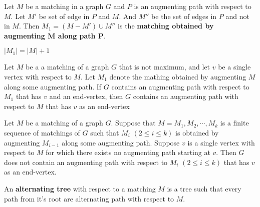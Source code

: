 \begin{definition}
	Let $M$ be a matching in a graph $G$ and $P$ is an augmenting path with respect to $M$.
	Let $M'$ be set of edge in $P$ and $M$.
	And $M''$ be the set of edges in $P$ and not in $M$.
	Then $M_1 = (M-M') \cup M''$ is the \textbf{matching obtained by augmenting M along path P}.
\end{definition}

\begin{remark}
	$|M_1| = |M|+1$
\end{remark}

\begin{theorem}
	Let $M$ be a a matching of a graph $G$ that is not maximum, and let $v$ be a single vertex with respect to $M$.
	Let $M_1$ denote the mathing obtained by augmenting $M$ along some augmenting path.
	If $G$ contains an augmenting path with respect to $M_1$ that has $v$ and an end-vertex, then $G$ contains an augmenting path with respect to $M$ that has $v$ as an end-vertex
\end{theorem}
\begin{corollary}
	Let $M$ be a matching of a graph $G$.
	Suppose that $M = M_1,M_2,\cdots,M_k$ is a finite sequence of matchings of $G$ such that $M_i$ $(2 \le i \le k)$ is obtained by augmenting $M_{i-1}$ along some augmenting path.
	Suppose $v$ is a single vertex with respect to $M$ for which there exists no augmenting path starting at $v$.
	Then $G$ does not contain an augmenting path with respect to $M_i$ $(2 \le i \le k)$ that has $v$ as an end-vertex.
\end{corollary}

\begin{definition}
	An \textbf{alternating tree} with respect to a matching $M$ is a tree such that every path from it's root are alternating path with respect to $M$.
\end{definition}

